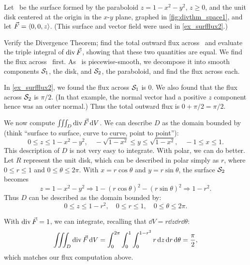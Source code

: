 \begin{example}\label{ex_divthm_space1}%
Let \surfaceS\ be the surface formed by the paraboloid $z=1-x^2-y^2$, $z\geq 0$, and the unit disk centered at the origin in the $x$-$y$ plane, graphed in \autoref{fig:divthm_space1}, and let $\vec F =\left\langle 0,0,z\right\rangle$. (This surface and vector field were used in \autoref{ex_surfflux2}.)

Verify the Divergence Theorem; find the total outward flux across \surfaceS\ and evaluate the triple integral of $\operatorname{div} \vec F$, showing that these two quantities are equal.
\solution
We find the flux across \surfaceS\ first. As \surfaceS\ is piecewise-smooth, we decompose it into smooth components $\mathcal{S}_1$, the disk, and $\mathcal{S}_2$, the paraboloid, and find the flux across each.

In \autoref{ex_surfflux2}, we found the flux across $\mathcal{S}_1$ is 0. We also found that the flux across $\mathcal{S}_2$ is $\pi/2$. (In that example, the normal vector had a positive $z$ component hence was an outer normal.) Thus the total outward flux is $0+\pi/2 = \pi/2$.

We now compute $\iiint_D \operatorname{div} \vec F\operatorname{d}\! V$. We can describe $D$ as the domain bounded by (think ``surface to surface, curve to curve, point to point''):
\[
0\leq z\leq 1-x^2-y^2,
\quad -\sqrt{1-x^2}\leq y\leq \sqrt{1-x^2},
\quad -1\leq x\leq 1.
\]
This description of $D$ is not very easy to integrate. With polar, we can do better. Let $R$ represent the unit disk, which can be described in polar simply as $r$, where $0\leq r\leq 1$ and $0\leq \theta\leq 2\pi$. With $x=r\cos \theta$ and $y=r\sin\theta$, the surface $\mathcal{S}_2$ becomes
\[z=1-x^2-y^2 \Rightarrow 1-(r\cos\theta)^2-(r\sin\theta)^2 \Rightarrow 1-r^2.\]
Thus $D$ can be described as the domain bounded by:
\[0\leq z\leq 1-r^2,\quad 0\leq r\leq 1,\quad 0\leq \theta\leq 2\pi.\]

With $\operatorname{div} \vec F = 1$, we can integrate, recalling that $\dd V = r\dd z\dd r\dd\theta$:
\[
\iiint_D\operatorname{div} \vec F\operatorname{d}\! V
= \int_0^{2\pi}\int_0^1\int_0^{1-r^2} r\operatorname{d}\! z\operatorname{d}\! r\operatorname{d}\!\theta = \frac{\pi}2,
\]
which matches our flux computation above.
\end{example}

